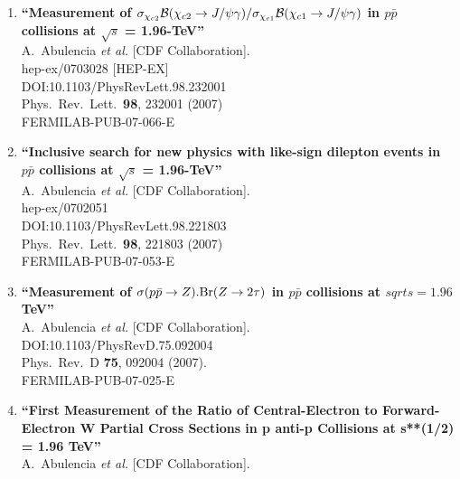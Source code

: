 \documentclass{article}
\begin{document}
\begin{enumerate}
\item%
{\bf ``Measurement of $\sigma_{\chi_{c2}}{\cal B}(\chi_{c2} \to J/\psi \gamma)/\sigma_{\chi_{c1}} {\cal B}(\chi_{c1} \to J/\psi \gamma)$ in $p \bar{p}$ collisions at $\sqrt{s}$ = 1.96-TeV''}
  \\{}A.~Abulencia {\it et al.} [CDF Collaboration].
  \\{}hep-ex/0703028 [HEP-EX]
  \\{}DOI:10.1103/PhysRevLett.98.232001
  \\{}Phys.\ Rev.\ Lett.\  {\bf 98}, 232001 (2007)
  \\{}FERMILAB-PUB-07-066-E
\item%
{\bf ``Inclusive search for new physics with like-sign dilepton events in $p \bar{p}$ collisions at $\sqrt{s}$ = 1.96-TeV''}
  \\{}A.~Abulencia {\it et al.} [CDF Collaboration].
  \\{}hep-ex/0702051
  \\{}DOI:10.1103/PhysRevLett.98.221803
  \\{}Phys.\ Rev.\ Lett.\  {\bf 98}, 221803 (2007)
  \\{}FERMILAB-PUB-07-053-E
\item%
{\bf ``Measurement of $\sigma(p \bar{p} \to Z) . {\rm Br}(Z \to 2\tau)$ in $p\bar{p}$ collisions at $sqrt{s}=1.96$ TeV''}
  \\{}A.~Abulencia {\it et al.} [CDF Collaboration].
  \\{}DOI:10.1103/PhysRevD.75.092004
  \\{}Phys.\ Rev.\ D {\bf 75}, 092004 (2007).
  \\{}FERMILAB-PUB-07-025-E
\item%
{\bf ``First Measurement of the Ratio of Central-Electron to Forward-Electron W Partial Cross Sections in p anti-p Collisions at s**(1/2) = 1.96 TeV''}
  \\{}A.~Abulencia {\it et al.} [CDF Collaboration].

\end{enumerate}
\end{document}
